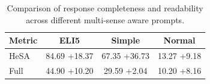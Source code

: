\documentclass{article}%
\begin{document}
%
\normalsize%


\begin{table}[h!]%
\centering%
\small%
\setlength{\tabcolsep}{4pt}%
\begin{tabular}{@{}l c c c@{}}%
\toprule%
\textbf{Metric}&\textbf{ELI5}&\textbf{Simple}&\textbf{Normal}\\%
\midrule%
HeSA&84.69 \textcolor{own_green}{+18.37}&67.35 \textcolor{own_green}{+36.73}&13.27 \textcolor{own_green}{+9.18}\\%
Full&44.90 \textcolor{own_green}{+10.20}&29.59 \textcolor{own_green}{+2.04}&10.20 \textcolor{own_green}{+8.16}\\%
\bottomrule%
%
\end{tabular}%
\caption{Comparison of response completeness and readability across different multi{-}sense aware prompts.}%
\end{table}

%
\end{document}
